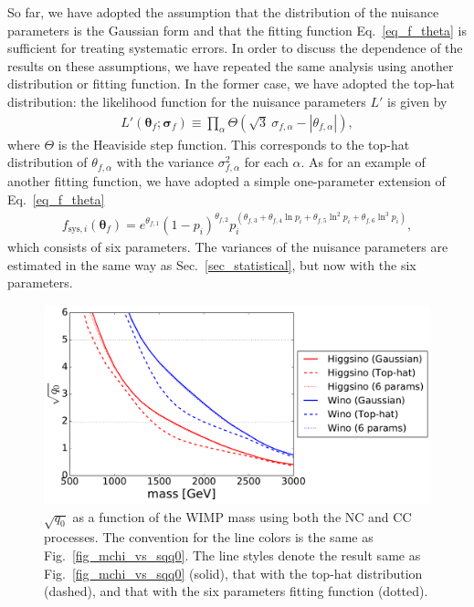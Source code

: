 \documentclass[12pt,twoside,book]{article}
\begin{document}
So far, we have adopted the assumption that the distribution of the nuisance parameters is the Gaussian form and that the fitting function Eq.~\eqref{eq_f_theta} is sufficient for treating systematic errors.
In order to discuss the dependence of the results on these assumptions, we have repeated the same analysis using another distribution or fitting function.
In the former case, we have adopted the top-hat distribution: the likelihood function for the nuisance parameters $L'$ is given by
\begin{align}
  L' (\bm{\theta}_f ; \bm{\sigma}_f) \equiv \prod_\alpha
  \Theta \left( \sqrt{3}\ \sigma_{f,\alpha}
  - \left| \theta_{f,\alpha} \right| \right),
\end{align}
where $\Theta$ is the Heaviside step function.
This corresponds to the top-hat distribution of $\theta_{f,\alpha}$ with the variance $\sigma_{f,\alpha}^2$ for each $\alpha$.
As for an example of another fitting function, we have adopted a simple one-parameter extension of Eq.~\eqref{eq_f_theta}
\begin{align}
 f_{\mathrm{sys}, i} (\bm{\theta}_f) =
 e^{\theta_{f,1}} (1 - p_i)^{\theta_{f,2}}
 p_i^{(\theta_{f,3} + \theta_{f,4} \ln p_i + \theta_{f,5} \ln^2 p_i
 + \theta_{f,6} \ln^3 p_i)},\label{eq_6_param}
\end{align}
which consists of six parameters.
The variances of the nuisance parameters are estimated in the same way as Sec.~\ref{sec_statistical}, but now with the six parameters.

\begin{figure}[t]
  \centering
  \includegraphics[width=0.7\linewidth]{mchi_vs_sqq0_comp.pdf}
  \caption{
    $\sqrt{q_0}$ as a function of the WIMP mass using both the NC and CC processes.
    The convention for the line colors is the same as Fig.~\ref{fig_mchi_vs_sqq0}.  The line styles denote the result same as Fig.~\ref{fig_mchi_vs_sqq0} (solid), that with the top-hat distribution (dashed), and that with the six parameters fitting function (dotted).
  }
  \label{fig_mchi_vs_sqq0_comp}
\end{figure}
\end{document}
